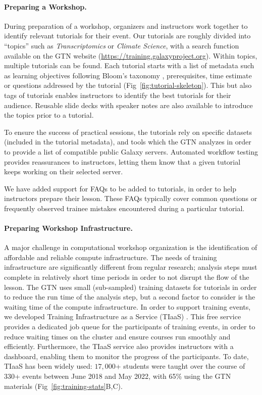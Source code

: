 \paragraph{Preparing a Workshop.} During preparation of a workshop, organizers and instructors work together to identify relevant tutorials for their event. Our tutorials are roughly divided into ``topics'' such as \emph{Transcriptomics} or \emph{Climate Science}, with a search function available on the GTN website (\url{https://training.galaxyproject.org}). Within topics, multiple tutorials can be found. Each tutorial starts with a list of metadata such as learning objectives following Bloom's taxonomy \cite{Bloom1956}, prerequisites, time estimate or questions addressed by the tutorial (Fig~\ref{fig:tutorial-skeleton}). This but also tags of tutorials enables instructors to identify the best tutorials for their audience. Reusable slide decks with speaker notes are also available to introduce the topics prior to a tutorial. 

To ensure the success of practical sessions, the tutorials rely on specific datasets (included in the tutorial metadata), and tools which the GTN analyzes in order to provide a list of compatible public Galaxy servers. Automated workflow testing \cite{galaxy-workflow-testing} provides reassurances to instructors, letting them know that a given tutorial keeps working on their selected server.

We have added support for FAQs to be added to tutorials, in order to help instructors prepare their lesson. These FAQs typically cover common questions or frequently observed trainee mistakes encountered during a particular tutorial.

\paragraph{Preparing Workshop Infrastructure.} A major challenge in computational workshop organization is the identification of affordable and reliable compute infrastructure. The needs of training infrastructure are significantly different from regular research; analysis steps must complete in relatively short time periods in order to not disrupt the flow of the lesson. The GTN uses small (sub-sampled) training datasets for tutorials in order to reduce the run time of the analysis step, but a second factor to consider is the waiting time of the compute infrastructure. 
In order to support training events, we developed Training Infrastructure as a Service (TIaaS) \cite{Rasche2020}. This free service provides a dedicated job queue for the participants of training events, in order to reduce waiting times on the cluster and ensure courses run smoothly and efficiently. Furthermore, the TIaaS service also provides instructors with a dashboard, enabling them to monitor the progress of the participants. To date, TIaaS has been widely used: $17,000$+ students were taught over the course of 330+ events between June 2018 and May 2022, with 65\% using the GTN materials (Fig~\ref{fig:training-stats}B,C).

